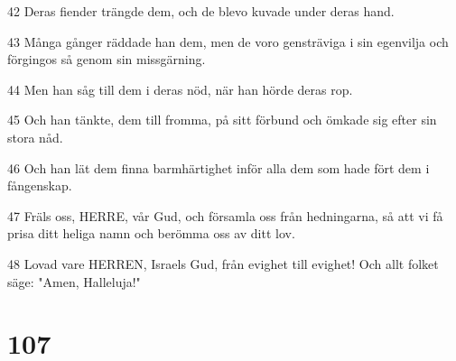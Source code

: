\par 42 Deras fiender trängde dem, och de blevo kuvade under deras hand.
\par 43 Många gånger räddade han dem, men de voro gensträviga i sin egenvilja och förgingos så genom sin missgärning.
\par 44 Men han såg till dem i deras nöd, när han hörde deras rop.
\par 45 Och han tänkte, dem till fromma, på sitt förbund och ömkade sig efter sin stora nåd.
\par 46 Och han lät dem finna barmhärtighet inför alla dem som hade fört dem i fångenskap.
\par 47 Fräls oss, HERRE, vår Gud, och församla oss från hedningarna, så att vi få prisa ditt heliga namn och berömma oss av ditt lov.
\par 48 Lovad vare HERREN, Israels Gud, från evighet till evighet! Och allt folket säge: "Amen, Halleluja!"

\chapter{107}

